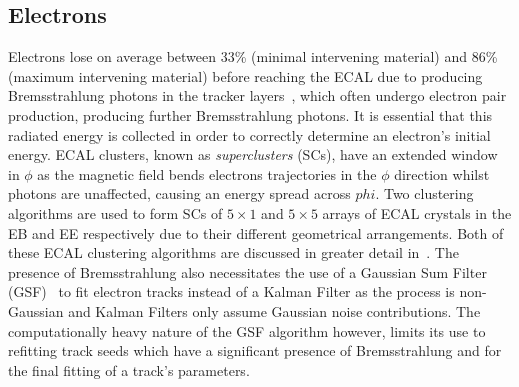 \subsection{Electrons}\label{subsec:electrons}
Electrons lose on average between 33\% (minimal intervening material) and 86\% (maximum intervening material) before reaching the ECAL due to producing Bremsstrahlung photons in the tracker layers~\cite{Khachatryan:2015hwa}, which often undergo electron pair production, producing further Bremsstrahlung photons.	
It is essential that this radiated energy is collected in order to correctly determine an electron's initial energy.
ECAL clusters, known as \emph{superclusters} (SCs), have an extended window in $\phi$ as the magnetic field bends electrons trajectories in the $\phi$ direction whilst photons are unaffected, causing an energy spread across $phi$.
Two clustering algorithms are used to form SCs of $5 \times 1$ and $5 \times 5$ arrays of ECAL crystals in the EB and EE respectively due to their different geometrical arrangements.
Both of these ECAL clustering algorithms are discussed in greater detail in~\cite{Khachatryan:2015hwa}.
The presence of Bremsstrahlung also necessitates the use of a Gaussian Sum Filter (GSF)~\cite{Adam:2003eca} to fit electron tracks instead of a Kalman Filter as the process is non-Gaussian and Kalman Filters only assume Gaussian noise contributions.
The computationally heavy nature of the GSF algorithm however, limits its use to refitting \KF track seeds which have a significant presence of Bremsstrahlung and for the final fitting of a track's parameters.

